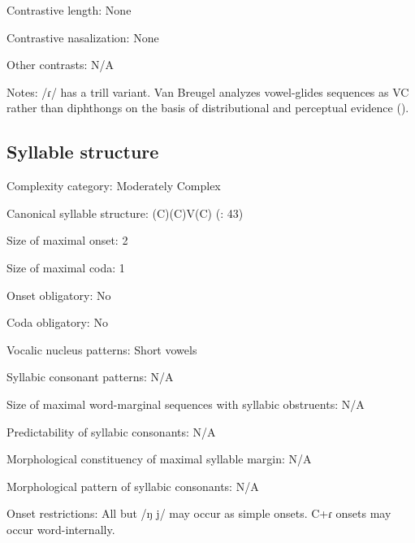 {\begin{appendixdesc}
\item[Contrastive length:] None

\item[Contrastive nasalization:] None

\item[Other contrasts:] N/A

\item[Notes:] /ɾ/ has a trill variant. Van Breugel analyzes vowel-glides sequences as VC rather than diphthongs on the basis of distributional and perceptual evidence (\citeyear[48]{VanBreugel2008}).
\end{appendixdesc}
\subsection*{Syllable structure}
\begin{appendixdesc}

\item[Complexity category:] Moderately Complex

\item[Canonical syllable structure:] (C)(C)V(C) (\citealt{VanBreugel2008}: 43)

\item[Size of maximal onset:] 2

\item[Size of maximal coda:] 1

\item[Onset obligatory:] No

\item[Coda obligatory:] No

\item[Vocalic nucleus patterns:] Short vowels

\item[Syllabic consonant patterns:] N/A

\item[Size of maximal word-marginal sequences with syllabic obstruents:] N/A

\item[Predictability of syllabic consonants:] N/A

\item[Morphological constituency of maximal syllable margin:] N/A

\item[Morphological pattern of syllabic consonants:] N/A

\item[Onset restrictions:] All but /ŋ j/ may occur as simple onsets. C+ɾ onsets may occur word-internally.


\end{appendixdesc}}
